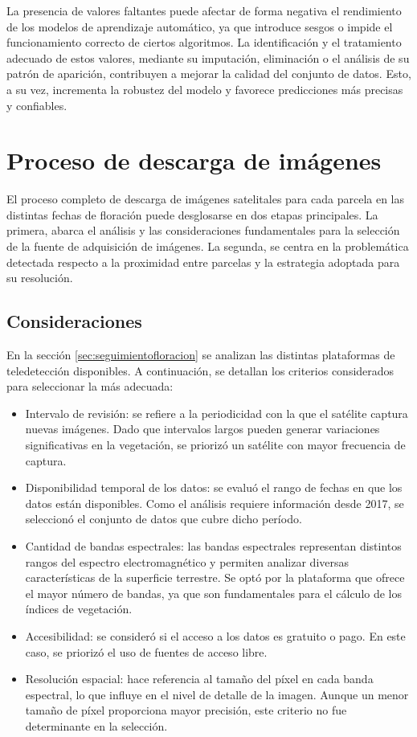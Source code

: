 La presencia de valores faltantes puede afectar de forma negativa el rendimiento
de los modelos de aprendizaje automático, ya que introduce sesgos o impide el
funcionamiento correcto de ciertos algoritmos. La identificación y el tratamiento 
adecuado de estos valores, mediante su imputación, eliminación o el análisis de su patrón 
de aparición, contribuyen a mejorar la calidad del conjunto de datos. Esto, a su vez, incrementa 
la robustez del modelo y favorece predicciones más precisas y confiables.

\section{Proceso de descarga de imágenes}
El proceso completo de descarga de imágenes satelitales para cada parcela en las distintas fechas de 
floración puede desglosarse en dos etapas principales. La primera, abarca el análisis y las consideraciones 
fundamentales para la selección de la fuente de adquisición de imágenes. La segunda, se centra en la 
problemática detectada respecto a la proximidad entre parcelas y la estrategia adoptada para su resolución.

\subsection{Consideraciones}
En la sección \ref{sec:seguimientofloracion} se analizan las distintas plataformas de teledetección 
disponibles. A continuación, se detallan los criterios considerados para 
seleccionar la más adecuada:

\begin{itemize}
  \item Intervalo de revisión: se refiere a la periodicidad con la que el satélite captura
    nuevas imágenes. Dado que intervalos largos pueden generar variaciones significativas 
    en la vegetación, se priorizó un satélite con mayor frecuencia de captura.
  \item Disponibilidad temporal de los datos: se evaluó el rango de fechas en que los datos
    están disponibles. Como el análisis requiere información desde 2017, se seleccionó el 
    conjunto de datos que cubre dicho período.
  \item Cantidad de bandas espectrales: las bandas espectrales representan distintos rangos 
    del espectro electromagnético y permiten analizar diversas características de la superficie
    terrestre. Se optó por la plataforma que ofrece el mayor número de bandas, ya que son 
    fundamentales para el cálculo de los índices de vegetación.
  \item Accesibilidad: se consideró si el acceso a los datos es gratuito o pago. En este caso, 
    se priorizó el uso de fuentes de acceso libre.
  \item Resolución espacial: hace referencia al tamaño del píxel en cada banda espectral, lo 
    que influye en el nivel de detalle de la imagen. Aunque un menor tamaño de píxel proporciona
     mayor precisión, este criterio no fue determinante en la selección.
\end{itemize}

